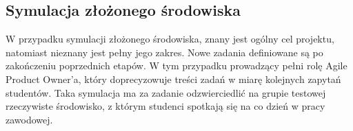 \subsection{Symulacja złożonego środowiska}

W przypadku symulacji złożonego środowiska, znany jest ogólny cel projektu, natomiast nieznany jest pełny jego zakres.
Nowe zadania definiowane są po zakończeniu poprzednich etapów.
W tym przypadku prowadzący pełni rolę Agile Product Owner’a, który doprecyzowuje treści zadań w miarę kolejnych zapytań studentów.
Taka symulacja ma za zadanie odzwierciedlić na grupie testowej rzeczywiste środowisko, z którym studenci spotkają się na co dzień w pracy zawodowej.




